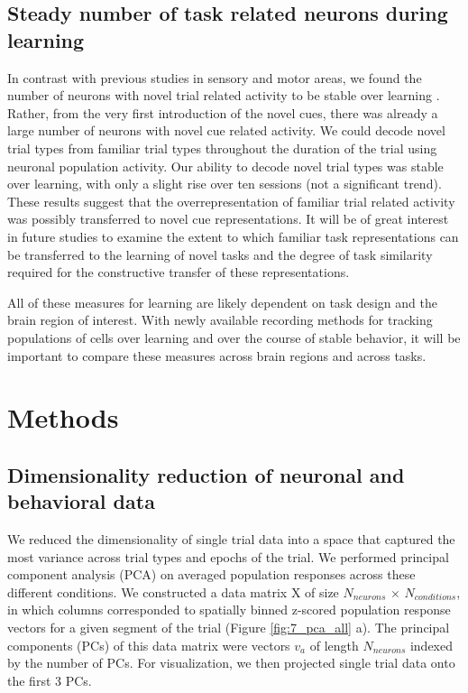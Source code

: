 \subsection{Steady number of task related neurons during learning}
 In contrast with previous studies in sensory and motor areas, we found the number of neurons with novel trial related activity to be stable over learning \citep{Poort2015, Peters2014}. Rather, from the very first introduction of the novel cues, there was already a large number of neurons with novel cue related activity. We could decode novel trial types from familiar trial types throughout the duration of the trial using neuronal population activity. Our ability to decode novel trial types was stable over learning, with only a slight rise over ten sessions (not a significant trend). These results suggest that the overrepresentation of familiar trial related activity was possibly transferred to novel cue representations. It will be of great interest in future studies to examine the extent to which familiar task representations can be transferred to the learning of novel tasks and the degree of task similarity required for the constructive transfer of these representations.

\bigskip

All of these measures for learning are likely dependent on task design and the brain region of interest. With newly available recording methods for tracking populations of cells over learning and over the course of stable behavior, it will be important to compare these measures across brain regions and across tasks.

\section{Methods}

\subsection{Dimensionality reduction of neuronal and behavioral data}
We reduced the dimensionality of single trial data into a space that captured the most variance across trial types and epochs of the trial. We performed principal component analysis (PCA) on averaged population responses across these different conditions. We constructed a data matrix X of size $N_{neurons}$ $\times$ $N_{conditions}$, in which columns corresponded to spatially binned z-scored population response vectors for a given segment of the trial (Figure \ref{fig:7_pca_all} a). The principal components (PCs) of this data matrix were vectors $v_a$ of length $N_{neurons}$ indexed by the number of PCs. For visualization, we then projected single trial data onto the first 3 PCs. 

